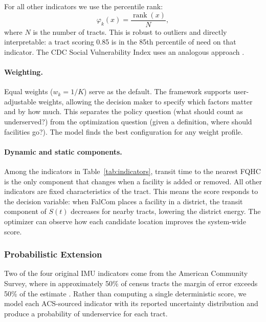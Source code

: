 \documentclass[11pt]{article}
\begin{document}
For all other indicators we use the percentile rank:
\begin{equation}\label{eq:percentile}
  \varphi_k(x) = \frac{\operatorname{rank}(x)}{N},
\end{equation}
where $N$ is the number of tracts. This is robust to outliers and directly
interpretable: a tract scoring 0.85 is in the 85th percentile of need on that
indicator. The CDC Social Vulnerability Index uses an analogous approach
\cite{CDC_SVI}.

\paragraph{Weighting.}
Equal weights ($w_k = 1/K$) serve as the default. The framework supports
user-adjustable weights, allowing the decision maker to specify which
factors matter and by how much. This separates the policy question (what
should count as underserved?) from the optimization question (given a
definition, where should facilities go?). The model finds the best
configuration for any weight profile.

\paragraph{Dynamic and static components.}
Among the indicators in Table~\ref{tab:indicators}, transit time to the
nearest FQHC is the only component that changes when a facility is added or
removed. All other indicators are fixed characteristics of the tract. This
means the score responds to the decision variable: when FalCom places a
facility in a district, the transit component of $S(t)$ decreases for nearby
tracts, lowering the district energy. The optimizer can observe how each
candidate location improves the system-wide score.


\subsubsection{Probabilistic Extension}\label{sec:prob-imu}

Two of the four original IMU indicators come from the American Community
Survey, where in approximately 50\% of census tracts the margin of error
exceeds 50\% of the estimate \cite{spielman2014patterns}. Rather than
computing a single deterministic score, we model each ACS-sourced indicator
with its reported uncertainty distribution and produce a probability of
underservice for each tract.
\end{document}
